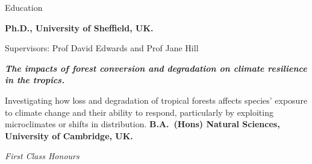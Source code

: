 \begin{rubric}{Education}

\entry*[2014 -- 2018]%
	\textbf{Ph.D., University of Sheffield, UK.}
	\par Supervisors: Prof David Edwards and Prof Jane Hill
	\par \textbf{\emph{The impacts of forest conversion and degradation on climate resilience in the tropics.}}
	\par Investigating how loss and degradation of tropical forests affects species' exposure to climate change and their ability to respond, particularly by exploiting microclimates or shifts in distribution.
%
\entry*[2010 -- 2013]%
	\textbf{B.A.~(Hons) Natural Sciences, University of Cambridge, UK.}\par
	\emph{First Class Honours}
%
\end{rubric}